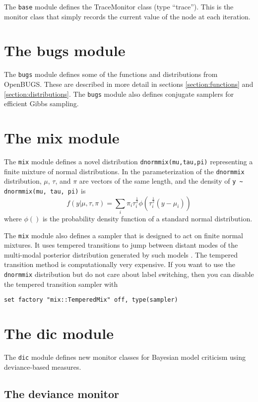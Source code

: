 \documentclass[11pt, a4paper, titlepage]{report}
\newcommand{\OpenBUGS}{\textsf{OpenBUGS}}
\begin{document}
The \verb+base+ module defines the TraceMonitor class (type
``trace''). This is the monitor class that simply records the current
value of the node at each iteration.

\section{The bugs module}

The \verb+bugs+ module defines some of the functions and distributions
from \OpenBUGS. These are described in more detail in sections
\ref{section:functions} and \ref{section:distributions}.  The
\verb+bugs+ module also defines conjugate samplers for efficient Gibbs
sampling.

\section{The mix module}

The \verb+mix+ module defines a novel distribution
\verb+dnormmix(mu,tau,pi)+ representing a finite mixture of normal
distributions. In the parameterization of the \verb+dnormmix+
distribution, $\mu$, $\tau$, and $\pi$ are vectors of the same length,
and the density of \verb+y ~ dnormmix(mu, tau, pi)+ is
\[
f(y | \mu, \tau, \pi) = \sum_i \pi_i \tau_i^{\frac{1}{2}} \phi( \tau^{\frac{1}{2}}_i (y - \mu_i))
\]
where $\phi()$ is the probability density function of a standard
normal distribution.

The \verb+mix+ module also defines a sampler that is designed to act
on finite normal mixtures. It uses tempered transitions to jump
between distant modes of the multi-modal posterior distribution
generated by such models \cite{Neal94,Celeux99}. The tempered
transition method is computationally very expensive. If you want to
use the \verb+dnormmix+ distribution but do not care about label
switching, then you can disable the tempered transition sampler with
\begin{verbatim}
set factory "mix::TemperedMix" off, type(sampler)
\end{verbatim}

\section{The dic module}

The \verb+dic+ module defines new monitor classes for Bayesian model
criticism using deviance-based measures. 

\subsection{The deviance monitor}
\end{document}
